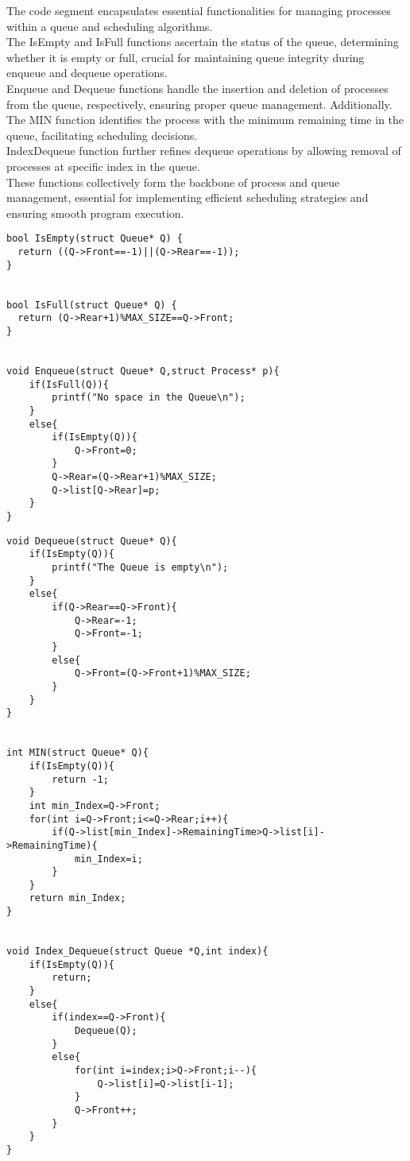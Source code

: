 \documentclass{article}
\begin{document}
The code segment encapsulates essential functionalities for managing processes within a queue and scheduling algorithms.\\
The IsEmpty and IsFull functions ascertain the status of the queue, determining whether it is empty or full, crucial for maintaining queue integrity during enqueue and dequeue operations.\\
Enqueue and Dequeue functions handle the insertion and deletion of processes from the queue, respectively, ensuring proper queue management. Additionally.\\
The MIN function identifies the process with the minimum remaining time in the queue, facilitating scheduling decisions.\\
Index\textunderscore{}Dequeue function further refines dequeue operations by allowing removal of processes at specific index in the queue.\\
These functions collectively form the backbone of process and queue management, essential for implementing efficient scheduling strategies and ensuring smooth program execution.\\


\begin{lstlisting}
bool IsEmpty(struct Queue* Q) {                                 
  return ((Q->Front==-1)||(Q->Rear==-1));
}


bool IsFull(struct Queue* Q) {                                  
  return (Q->Rear+1)%MAX_SIZE==Q->Front;
}


void Enqueue(struct Queue* Q,struct Process* p){                 
    if(IsFull(Q)){
        printf("No space in the Queue\n");
    }
    else{
        if(IsEmpty(Q)){
            Q->Front=0;
        }
        Q->Rear=(Q->Rear+1)%MAX_SIZE;
        Q->list[Q->Rear]=p;
    }
}
\end{lstlisting}
\newpage
\begin{lstlisting}[caption={Queue Operations}, label={lst:queue_operations},firstnumber=23]
void Dequeue(struct Queue* Q){                                   
    if(IsEmpty(Q)){
        printf("The Queue is empty\n");
    }
    else{
        if(Q->Rear==Q->Front){
            Q->Rear=-1;
            Q->Front=-1;
        }
        else{
            Q->Front=(Q->Front+1)%MAX_SIZE;
        }
    }
}


int MIN(struct Queue* Q){
    if(IsEmpty(Q)){
        return -1;
    }
    int min_Index=Q->Front;
    for(int i=Q->Front;i<=Q->Rear;i++){
        if(Q->list[min_Index]->RemainingTime>Q->list[i]->RemainingTime){
            min_Index=i;
        }
    }
    return min_Index;
}


void Index_Dequeue(struct Queue *Q,int index){
    if(IsEmpty(Q)){
        return;
    }
    else{
        if(index==Q->Front){
            Dequeue(Q);
        }
        else{
            for(int i=index;i>Q->Front;i--){
                Q->list[i]=Q->list[i-1];
            }
            Q->Front++;
        }
    }
}
\end{lstlisting}
\end{document}

